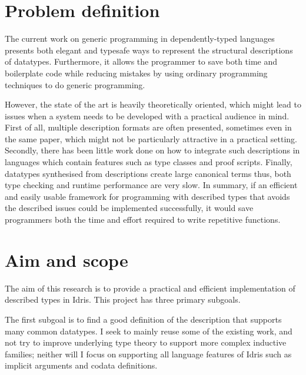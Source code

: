 \documentclass{ituthesis}
\theoremstyle{definition}
\begin{document}


\section{Problem definition}
\label{sec:ProblemDefinition}
The current work on generic programming in dependently-typed languages presents both elegant and typesafe ways to represent the structural descriptions of datatypes.
Furthermore, it allows the programmer to save both time and boilerplate code while reducing mistakes by using ordinary programming techniques to do generic programming.

However, the state of the art is heavily theoretically oriented, which might lead to issues when a system needs to be developed with a practical audience in mind.
First of all, multiple description formats are often presented, sometimes even in the same paper, which might not be particularly attractive in a practical setting.
Secondly, there has been little work done on how to integrate such descriptions in languages which contain features such as type classes and proof scripts.
Finally, datatypes synthesised from descriptions create large canonical terms thus, both type checking and runtime performance are very slow.
In summary, if an efficient and easily usable framework for programming with described types that avoids the described issues could be implemented successfully, it would save programmers both the time and effort required to write repetitive functions.

\section{Aim and scope}
\label{sec:AimandScope}
The aim of this research is to provide a practical and efficient implementation of described types in Idris.
This project has three primary subgoals.

The first subgoal is to find a good definition of the description that supports many common datatypes.
I seek to mainly reuse some of the existing work, and not try to improve underlying type theory to support more complex inductive families; neither will I focus on supporting all language features of Idris such as implicit arguments and codata definitions.
\end{document}
